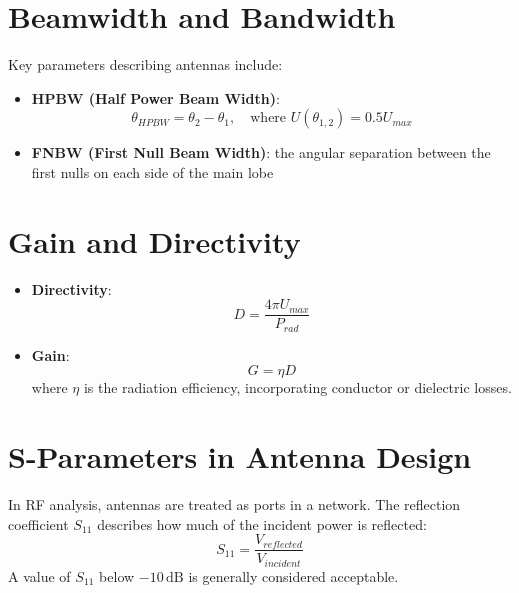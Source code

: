 \section{Beamwidth and Bandwidth}

Key parameters describing antennas include:
\begin{itemize}
    \item \textbf{HPBW (Half Power Beam Width)}:
    \[
    \theta_{HPBW} = \theta_2 - \theta_1, \quad \text{where } U(\theta_{1,2}) = 0.5 U_{max}
    \]
    \item \textbf{FNBW (First Null Beam Width)}: the angular separation between the first nulls on each side of the main lobe
\end{itemize}

\section{Gain and Directivity}

\begin{itemize}
    \item \textbf{Directivity}:
    \[
    D = \frac{4\pi U_{max}}{P_{rad}}
    \]
    \item \textbf{Gain}:
    \[
    G = \eta D
    \]
    where $\eta$ is the radiation efficiency, incorporating conductor or dielectric losses.
\end{itemize}

\section{S-Parameters in Antenna Design}

In RF analysis, antennas are treated as ports in a network. The reflection coefficient $S_{11}$ describes how much of the incident power is reflected:
\[
S_{11} = \frac{V_{reflected}}{V_{incident}}
\]
A value of $S_{11}$ below $-10\,\mathrm{dB}$ is generally considered acceptable.

